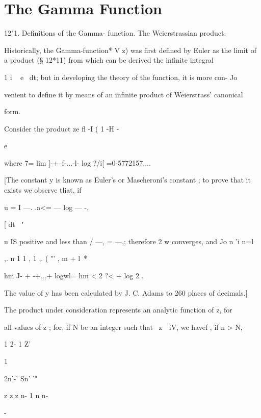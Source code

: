 \chapter{The Gamma Function} 

12"1. Definitions of the Gamma- function. The Weierstrassian product. 

Historically, the Gamma-function* V z) was first defined by Euler as the 
limit of a product (§ 12*11) from which can be derived the infinite integral 

1 i ~ e~ dt; but in developing the theory of the function, it is more con- 
Jo 

venient to define it by means of an infinite product of Weierstrass' canonical 

form. 



Consider the product ze  fl -I ( 1 -H - 



e   



where 7= lim ]-+--f-...-l- log ?/i[ =0-5772157.... 

[The constant y is known as Euler's or Mascheroni's constant ; to prove that it 
exists we observe tliat, if 

u = I —. .a<= — log — -, 

[  dt \ "  

u  IS positive and less than / —, = —,; therefore 2 w  converges, and 
Jo n  'i  n=l 

,. n 1 1 , 1 ,. ( "' , m + l\ * 

hm J- + -+...+ logwl= hm < 2 ?<  + log \= 2   . 

The value of y has been calculated by J. C. Adams to 260 places of decimals.] 

The product under consideration represents an analytic function of z, for 

all values of z ; for, if N be an integer such that \ z\ \    iV, we havef , if n > N, 





1 2- 1 Z' 


1 




2n'-' Sn' '" 


  


z      z z  
n-   1 n n- 


- 



